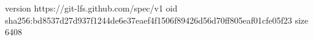 version https://git-lfs.github.com/spec/v1
oid sha256:bd8537d27d937f1244de6e37eaef4f1506f89426d56d70ff805eaf01cfe05f23
size 6408
